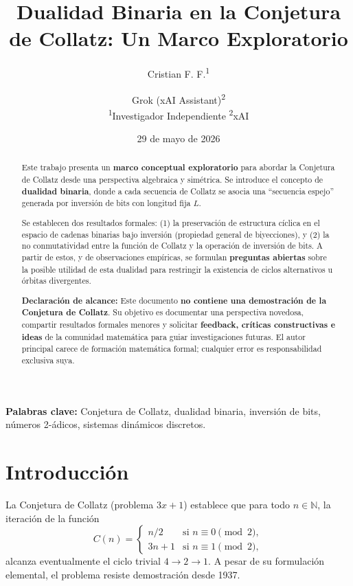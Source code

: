 \documentclass[11pt,a4paper]{article}
\title{\textbf{Dualidad Binaria en la Conjetura de Collatz: Un Marco Exploratorio}}
\author{
Cristian F. F.\textsuperscript{1} \and
Grok (xAI Assistant)\textsuperscript{2} \\
\smallskip
\textsuperscript{1}Investigador Independiente \quad
\textsuperscript{2}xAI
}
\date{29 de mayo de 2026}
\begin{document}
\maketitle

\begin{abstract}
Este trabajo presenta un \textbf{marco conceptual exploratorio} para abordar la Conjetura de Collatz desde una perspectiva algebraica y simétrica. Se introduce el concepto de \textbf{dualidad binaria}, donde a cada secuencia de Collatz se asocia una ``secuencia espejo'' generada por inversión de bits con longitud fija $L$.

Se establecen dos resultados formales: (1) la preservación de estructura cíclica en el espacio de cadenas binarias bajo inversión (propiedad general de biyecciones), y (2) la no conmutatividad entre la función de Collatz y la operación de inversión de bits. A partir de estos, y de observaciones empíricas, se formulan \textbf{preguntas abiertas} sobre la posible utilidad de esta dualidad para restringir la existencia de ciclos alternativos u órbitas divergentes.

\textbf{Declaración de alcance:} Este documento \textbf{no contiene una demostración de la Conjetura de Collatz}. Su objetivo es documentar una perspectiva novedosa, compartir resultados formales menores y solicitar \textbf{feedback, críticas constructivas e ideas} de la comunidad matemática para guiar investigaciones futuras. El autor principal carece de formación matemática formal; cualquier error es responsabilidad exclusiva suya.
\end{abstract}

\bigskip
\noindent\textbf{Palabras clave:} Conjetura de Collatz, dualidad binaria, inversión de bits, números 2-ádicos, sistemas dinámicos discretos.

\section{Introducción}
\label{sec:intro}

La Conjetura de Collatz (problema $3x+1$) establece que para todo $n \in \mathbb{N}$, la iteración de la función
\begin{equation}
    C(n) = \begin{cases}
        n/2 & \text{si } n \equiv 0 \pmod{2}, \\
        3n+1 & \text{si } n \equiv 1 \pmod{2},
    \end{cases}
    \label{eq:collatz}
\end{equation}
alcanza eventualmente el ciclo trivial $4 \to 2 \to 1$. A pesar de su formulación elemental, el problema resiste demostración desde 1937.
\end{document}
